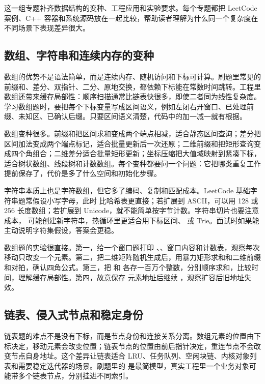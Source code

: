 
这一组专题补齐数据结构的变种、工程应用和实验要求。每个专题都把 LeetCode 案例、C++ 容器和系统源码放在一起比较，帮助读者理解为什么同一个复杂度在不同场景下表现差异很大。

\subsection{数组、字符串和连续内存的变种}

数组的优势不是语法简单，而是连续内存、随机访问和下标可计算。刷题里常见的前缀和、差分、双指针、二分、原地交换，都依赖下标能在常数时间跳转。工程里数组还带来缓存局部性：顺序扫描通常比链表快很多，即使二者同为线性复杂度。学习数组题时，要把每个下标变量写成区间语义，例如左闭右开窗口、已处理前缀、未知区、已确认后缀。只要区间语义清楚，代码中的加一减一就有根据。

数组变种很多。前缀和把区间求和变成两个端点相减，适合静态区间查询；差分把区间加法变成两个端点标记，适合批量更新后一次还原；二维前缀和把矩形查询变成四个角组合；二维差分适合批量矩形更新；坐标压缩把大值域映射到紧凑下标，适合树状数组、线段树和计数数组。每个变种都要问一个问题：它把哪类重复工作提前保存了，代价是多了什么空间和初始化步骤。

字符串本质上也是字符数组，但它多了编码、复制和匹配成本。LeetCode 基础字符串题常假设小写字母，此时  比哈希表更直接；若扩展到 ASCII，可以用 128 或 256 长度数组；若扩展到 Unicode，就不能简单按字节计数。字符串切片也要注意成本， 可能创建新字符串，热循环里更适合用下标区间、 或 Trie。面试时如果能主动说明字符集假设，答案会更稳。

数组题的实验很直接。第一，给一个窗口题打印 、、窗口内容和计数表，观察每次移动只改变一个元素。第二，把二维矩阵随机生成后，用暴力矩形求和和二维前缀和对拍，确认四角公式。第三，把  和  各存一百万个整数，分别顺序求和，比较时间，理解缓存局部性。第四，故意保存  元素地址后继续 ，观察扩容后旧地址失效。

\subsection{链表、侵入式节点和稳定身份}

链表题的难点不是没有下标，而是节点身份和连接关系分离。数组元素的位置由下标决定，移动元素会改变位置；链表节点的位置由前后指针决定，重连节点不会改变节点自身地址。这个差异让链表适合 LRU、任务队列、空闲块链、内核对象列表和需要稳定迭代器的场景。刷题里的  是最简模型，真实工程里一个业务对象可能带多个链表节点，分别挂进不同索引。

